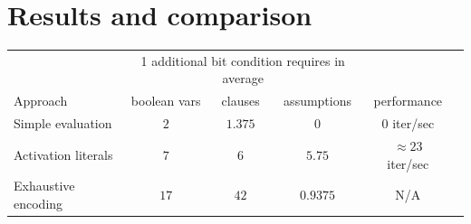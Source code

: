\section{Results and comparison}
\label{sec:results}
%
%
\begin{table}
 \begin{center}
  \begin{tabular}{lccccc}
                               & \multicolumn{3}{c}{1 additional bit condition requires in average} & \\
   Approach                    & boolean vars & clauses & assumptions   & performance \\
  \hline
   Simple evaluation           & $2$          & $1.375$ & $0$           & $0$ iter/sec \\
   Activation literals         & $7$          & $6$     & $5.75$        & $\approx23$ iter/sec \\
   Exhaustive encoding         & $17$         & $42$    & $0.9375$      & N/A \\

\end{tabular}
\end{center}
\end{table}
